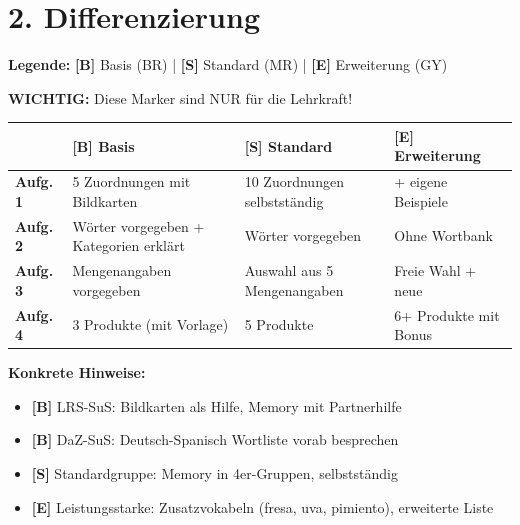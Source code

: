 \documentclass[11pt, a4paper]{article}
\newcommand{\B}{\textcolor{basis}{\textbf{[B]}}}
\newcommand{\Std}{\textcolor{standard}{\textbf{[S]}}}
\newcommand{\E}{\textcolor{erweiterung}{\textbf{[E]}}}
\begin{document}

\section*{2. Differenzierung}

\begin{differenzierung}
\textbf{Legende:} \B{} Basis (BR) | \Std{} Standard (MR) | \E{} Erweiterung (GY)

\vspace{0.5em}
\textbf{WICHTIG:} Diese Marker sind NUR für die Lehrkraft!
\end{differenzierung}

\vspace{1em}

\begin{tabularx}{\textwidth}{|l|X|X|X|}
\hline
& \B{} \textbf{Basis} & \Std{} \textbf{Standard} & \E{} \textbf{Erweiterung} \\
\hline
\textbf{Aufg. 1} & 5 Zuordnungen mit Bildkarten & 10 Zuordnungen selbstständig & + eigene Beispiele \\
\hline
\textbf{Aufg. 2} & Wörter vorgegeben + Kategorien erklärt & Wörter vorgegeben & Ohne Wortbank \\
\hline
\textbf{Aufg. 3} & Mengenangaben vorgegeben & Auswahl aus 5 Mengenangaben & Freie Wahl + neue \\
\hline
\textbf{Aufg. 4} & 3 Produkte (mit Vorlage) & 5 Produkte & 6+ Produkte mit Bonus \\
\hline
\end{tabularx}

\vspace{1em}

\textbf{Konkrete Hinweise:}
\begin{itemize}
    \item \B{} LRS-SuS: Bildkarten als Hilfe, Memory mit Partnerhilfe
    \item \B{} DaZ-SuS: Deutsch-Spanisch Wortliste vorab besprechen
    \item \Std{} Standardgruppe: Memory in 4er-Gruppen, selbstständig
    \item \E{} Leistungsstarke: Zusatzvokabeln (fresa, uva, pimiento), erweiterte Liste
\end{itemize}

\end{document}

